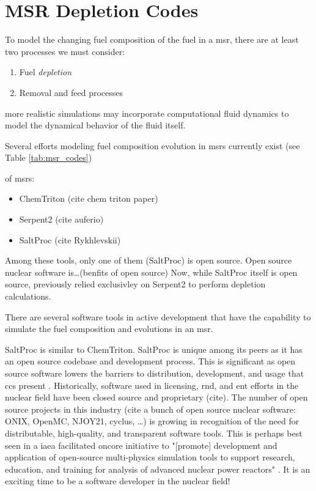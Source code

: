 \section{MSR Depletion Codes}%
\label{sec:msr_codes}

To model the changing fuel composition of the fuel in a \Gls{msr}, there are at least two processes we must consider:
\begin{enumerate}
    \item Fuel {\it depletion}
    \item Removal and feed processes
\end{enumerate}

more realistic simulations may incorporate computational fluid dynamics to model the dynamical behavior of the fluid itself.

Several efforts modeling fuel composition evolution in \Gls{msr}s currently exist (see Table \ref{tab:msr_codes})

of \Gls{msr}s:
\begin{itemize}
    \item ChemTriton (cite chem triton paper)
    \item Serpent2 (cite auferio)
    \item SaltProc (cite Rykhlevskii)
\end{itemize}

Among these tools, only one of them (SaltProc) is open source. Open source nuclear software is\ldots (benfits of open source) 
Now, while SaltProc itself is open source, previously relied exclusivley on Serpent2 to perform depletion calculations.

%
%
%

There are several software tools in active development that have the capability to simulate the fuel composition and evolutions in an \Gls{msr}.


SaltProc is similar to ChemTriton. SaltProc is unique among its peers as it has an open source codebase and development process. This is significant as open source software lowers the barriers to distribution, development, and usage that \Gls{cc}s present \cite{fiorina_initiative_2021}. Historically, software used in licensing, \Gls{rnd}, and \Gls{ent} efforts in the nuclear field have been closed source and proprietary (cite). The number of open source projects in this industry (cite a bunch of open source nuclear software:
ONIX, OpenMC, NJOY21, cyclus, \ldots) is growing in recognition of the need for distributable, high-quality, and transparent software tools. This is perhaps best seen in a \Gls{iaea} facilitated \Gls{oncore} initiative to "[promote] development and application of open-source multi-physics simulation tools to support research, education, and training for analysis of advanced nuclear power reactors" \cite{iaea_open-source}. It is an exciting time to be a software developer in the nuclear field!

